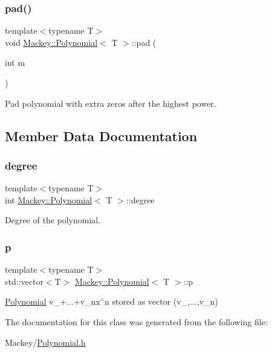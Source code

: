 \subsubsection{\texorpdfstring{pad()}{pad()}}
{\footnotesize\ttfamily template$<$typename T$>$ \\
void \hyperlink{classMackey_1_1Polynomial}{Mackey\+::\+Polynomial}$<$ T $>$\+::pad (\begin{DoxyParamCaption}\item[{int}]{m }\end{DoxyParamCaption})\hspace{0.3cm}{\ttfamily [inline]}}



Pad polynomial with extra zeros after the highest power. 



\subsection{Member Data Documentation}
\mbox{\label{classMackey_1_1Polynomial_a3f55b12a6eee67da2f55e87b97f06349}} 
\subsubsection{\texorpdfstring{degree}{degree}}
{\footnotesize\ttfamily template$<$typename T$>$ \\
int \hyperlink{classMackey_1_1Polynomial}{Mackey\+::\+Polynomial}$<$ T $>$\+::degree}



Degree of the polynomial. 

\mbox{\label{classMackey_1_1Polynomial_ac2784853ce2afbcc21860a9e54e15711}} 
\subsubsection{\texorpdfstring{p}{p}}
{\footnotesize\ttfamily template$<$typename T$>$ \\
std\+::vector$<$T$>$ \hyperlink{classMackey_1_1Polynomial}{Mackey\+::\+Polynomial}$<$ T $>$\+::p}



\hyperlink{classMackey_1_1Polynomial}{Polynomial} v\+\_+...+v\+\_\+nx$^\wedge$n stored as vector (v\+\_,...,v\+\_\+n) 



The documentation for this class was generated from the following file\+:\begin{DoxyCompactItemize}
\item 
Mackey/\hyperlink{Polynomial_8h}{Polynomial.\+h}\end{DoxyCompactItemize}
